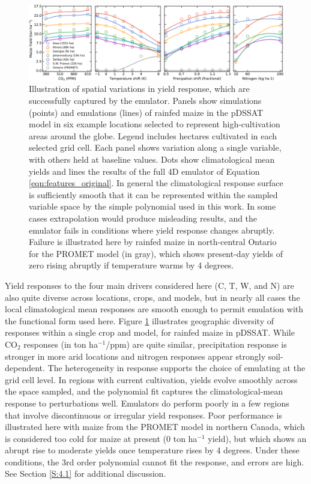 \documentclass[gmd, manuscript]{copernicus} %
\begin{document}
\begin{figure}[ht]
\centering
    \includegraphics[width=16.3cm]{figures/regression_example.png}
    \caption{
    Illustration of spatial variations in yield response, which are successfully captured by the emulator. 
    Panels show simulations (points) and emulations (lines) of rainfed maize in the pDSSAT model in six example locations selected to represent high-cultivation areas around the globe. 
    Legend includes hectares cultivated in each selected grid cell. 
    Each panel shows variation along a single variable, with others held at baseline values. 
    Dots show climatological mean yields and lines the results of the full 4D emulator of Equation \ref{eqn:features_original}. 
    In general the climatological response surface is sufficiently smooth that it can be represented within the sampled variable space by the simple polynomial used in this work. 
    In some cases extrapolation would produce misleading results, and the emulator fails in conditions where yield response changes abruptly. 
    Failure is illustrated here by rainfed maize in north-central Ontario for the PROMET model (in gray), which shows present-day yields of zero rising abruptly if temperature warms by 4 degrees.
    }
   \label{fig:regression}
\end{figure}

Yield responses to the four main drivers considered here (C, T, W, and N) are also quite diverse across locations, crops, and models, but in nearly all cases the local climatological mean responses are smooth enough to permit emulation with the functional form used here.
Figure \ref{fig:regression} illustrates geographic diversity of responses within a single crop and model, for rainfed maize in pDSSAT. While CO$_2$ responses (in ton ha$^{-1}$/ppm) are quite similar, precipitation response is stronger in more arid locations and nitrogen responses appear strongly soil-dependent. 
The heterogeneity in response supports the choice of emulating at the grid cell level. 
In regions with current cultivation, yields evolve smoothly across the space sampled, and the polynomial fit captures the climatological-mean response to perturbations well. 
Emulators do perform poorly in a few regions that involve discontinuous or irregular yield responses. 
Poor performance is illustrated here with maize from the PROMET model in northern Canada, which is considered too cold for maize at present (0 ton ha$^{-1}$ yield), but which shows an abrupt rise to moderate yields once temperature rises by 4 degrees. 
Under these conditions, the 3rd order polynomial cannot fit the response, and errors are high. See Section \ref{S:4.1} for additional discussion. 
\end{document}
